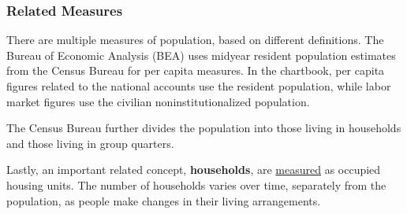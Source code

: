 \begin{minipage}{0.76\textwidth}
\end{minipage}
\vspace{1mm}

\subsubsection*{Related Measures}
\begin{minipage}{0.76\textwidth}
\small There are multiple measures of population, based on different definitions. The Bureau of Economic Analysis (BEA) uses midyear resident population estimates from the Census Bureau for per capita measures. In the chartbook, per capita figures related to the national accounts use the resident population, while labor market figures use the civilian noninstitutionalized population. 

The Census Bureau further divides the population into those living in households and those living in group quarters.  

Lastly, an important related concept, \textbf{households}, are \href{https://www.census.gov/housing/hvs/index.html}{measured} as occupied housing units. The number of households varies over time, separately from the population, as people make changes in their living arrangements.  
\end{minipage}
\newpage
